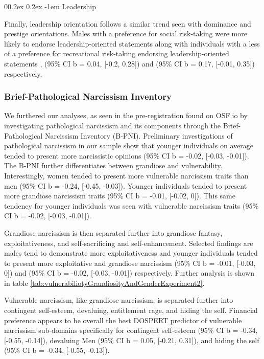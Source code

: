 \documentclass[
  donotrepeattitle,doc, 12pt, a4paper,floatsintext]{apa7}
\makeatletter
\let\oldparagraph\paragraph
\renewcommand{\paragraph}[1]{\oldparagraph{#1}\mbox{}}
\renewcommand{\paragraph}{\@startsection{paragraph}{4}{\parindent}%
  {0\baselineskip \@plus 0.2ex \@minus 0.2ex}%
  {-1em}%
  {\normalfont\normalsize\bfseries\itshape\typesectitle}}
\makeatother
\begin{document}
\hypertarget{leadership-1}{%
\paragraph{Leadership}\label{leadership-1}}

Finally, leadership orientation follows a similar trend seen with dominance and prestige orientations. Males with a preference for social risk-taking were more likely to endorse leadership-oriented statements along with individuals with a less of a preference for recreational risk-taking endorsing leadership-oriented statements , (95\% CI b = 0.04, {[}-0.2, 0.28{]}) and (95\% CI b = 0.17, {[}-0.01, 0.35{]}) respectively.

\hypertarget{brief-pathological-narcissism-inventory-1}{%
\subsubsection{Brief-Pathological Narcissism Inventory}\label{brief-pathological-narcissism-inventory-1}}

We furthered our analyses, as seen in the pre-registration found on OSF.io by investigating pathological narcissism and its components through the Brief-Pathological Narcissism Inventory (B-PNI). Preliminary investigations of pathological narcissism in our sample show that younger individuals on average tended to present more narcissistic opinions (95\% CI b = -0.02, {[}-0.03, -0.01{]}). The B-PNI further differentiates between grandiose and vulnerability. Interestingly, women tended to present more vulnerable narcissism traits than men (95\% CI b = -0.24, {[}-0.45, -0.03{]}). Younger individuals tended to present more grandiose narcissism traits (95\% CI b = -0.01, {[}-0.02, 0{]}). This same tendency for younger individuals was seen with vulnerable narcissism traits (95\% CI b = -0.02, {[}-0.03, -0.01{]}).

Grandiose narcissism is then separated further into grandiose fantasy, exploitativeness, and self-sacrificing and self-enhancement. Selected findings are males tend to demonstrate more exploitativeness and younger individuals tended to present more exploitative and grandiose narcissism (95\% CI b = -0.01, {[}-0.03, 0{]}) and (95\% CI b = -0.02, {[}-0.03, -0.01{]}) respectively. Further analysis is shown in table \ref{tab:vulnerabiliotyGrandiosityAndGenderExperiment2}.

Vulnerable narcissism, like grandiose narcissism, is separated further into contingent self-esteem, devaluing, entitlement rage, and hiding the self. Financial preference appears to be overall the best DOSPERT predictor of vulnerable narcissism sub-domains specifically for contingent self-esteem (95\% CI b = -0.34, {[}-0.55, -0.14{]}), devaluing Men (95\% CI b = 0.05, {[}-0.21, 0.31{]}), and hiding the self (95\% CI b = -0.34, {[}-0.55, -0.13{]}).
\end{document}

